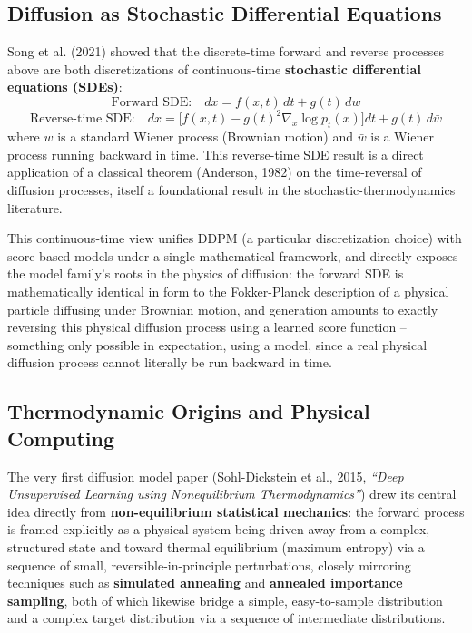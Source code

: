 \documentclass[12pt,a4paper]{article}
\begin{document}
\subsection{Diffusion as Stochastic Differential Equations}

Song et al. (2021) showed that the discrete-time forward and reverse processes above are both discretizations of continuous-time \textbf{stochastic differential equations (SDEs)}:
\[
\text{Forward SDE:} \quad dx = f(x,t)\,dt + g(t)\,dw
\]
\[
\text{Reverse-time SDE:} \quad dx = \big[f(x,t) - g(t)^2 \nabla_x \log p_t(x)\big]dt + g(t)\,d\bar w
\]
where $w$ is a standard Wiener process (Brownian motion) and $\bar w$ is a Wiener process running backward in time. This reverse-time SDE result is a direct application of a classical theorem (Anderson, 1982) on the time-reversal of diffusion processes, itself a foundational result in the stochastic-thermodynamics literature.

\begin{keyidea}
This continuous-time view unifies DDPM (a particular discretization choice) with score-based models under a single mathematical framework, and directly exposes the model family's roots in the physics of diffusion: the forward SDE is mathematically identical in form to the Fokker-Planck description of a physical particle diffusing under Brownian motion, and generation amounts to exactly reversing this physical diffusion process using a learned score function -- something only possible in expectation, using a model, since a real physical diffusion process cannot literally be run backward in time.
\end{keyidea}

\subsection{Thermodynamic Origins and Physical Computing}

\begin{keyidea}
The very first diffusion model paper (Sohl-Dickstein et al., 2015, \emph{``Deep Unsupervised Learning using Nonequilibrium Thermodynamics''}) drew its central idea directly from \textbf{non-equilibrium statistical mechanics}: the forward process is framed explicitly as a physical system being driven away from a complex, structured state and toward thermal equilibrium (maximum entropy) via a sequence of small, reversible-in-principle perturbations, closely mirroring techniques such as \textbf{simulated annealing} and \textbf{annealed importance sampling}, both of which likewise bridge a simple, easy-to-sample distribution and a complex target distribution via a sequence of intermediate distributions.
\end{keyidea}
\end{document}
